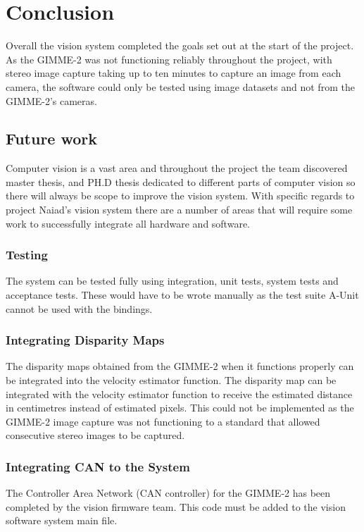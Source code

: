 \section{Conclusion}\label{sec:conclusion}
Overall the vision system completed the goals set out at the start of the project. As the GIMME-2 was not functioning reliably throughout the project, with stereo image capture taking up to ten minutes to capture an image from each camera, the software could only be tested using image datasets and not from the GIMME-2's cameras. 
\subsection{Future work}
Computer vision is a vast area and throughout the project the team discovered master thesis, and PH.D thesis dedicated to different parts of computer vision so there will always be scope to improve the vision system. With specific regards to project Naiad's vision system there are a number of areas that will require some work to successfully integrate all hardware and software.
\subsubsection{Testing}
The system can be tested fully using integration, unit tests, system tests and acceptance tests. These would have to be wrote manually as the test suite A-Unit cannot be used with the bindings.

\subsubsection{Integrating Disparity Maps}
The disparity maps obtained from the GIMME-2 when it functions properly can be integrated into the velocity estimator function.
The disparity map can be integrated with the velocity estimator function to receive the estimated distance in centimetres instead of estimated pixels. This could not be implemented as the GIMME-2 image capture was not functioning to a standard that allowed consecutive stereo images to be captured.

\subsubsection{Integrating CAN to the System}
The Controller Area Network (CAN controller) for the GIMME-2 has been completed by the vision firmware team. This code must be added to the vision software system main file.

